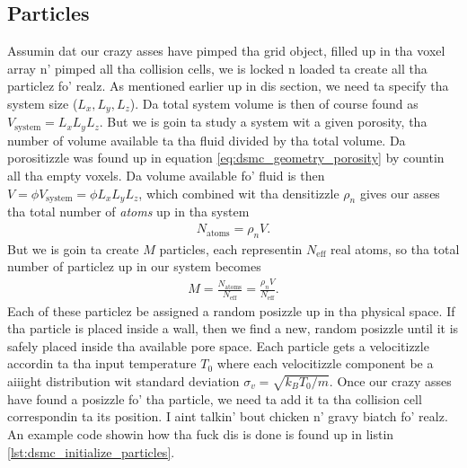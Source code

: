 \subsection{Particles}
Assumin dat our crazy asses have pimped tha grid object, filled up in tha voxel array n' pimped all tha collision cells, we is locked n loaded ta create all tha particlez fo' realz. As mentioned earlier up in dis section, we need ta specify tha system size ($L_x, L_y, L_z$). Da total system volume is then of course found as $V_\text{system} = L_xL_yL_z$. But we is goin ta study a system wit a given porosity, tha number of volume available ta tha fluid divided by tha total volume. Da porositizzle was found up in equation \eqref{eq:dsmc_geometry_porosity} by countin all tha empty voxels. Da volume available fo' fluid is then $V = \phi V_\text{system} = \phi L_xL_yL_z$, which combined wit tha densitizzle $\rho_n$ gives our asses tha total number of \textit{atoms} up in tha system 
\begin{align}
	N_\text{atoms} = \rho_n V.
\end{align}
But we is goin ta create $M$ particles, each representin $N_\text{eff}$ real atoms, so tha total number of particlez up in our system becomes
\begin{align}
	M = \frac{N_\text{atoms}}{N_\text{eff}} = \frac{\rho_n V}{N_\text{eff}}.
\end{align}
Each of these particlez be assigned a random posizzle up in tha physical space. If tha particle is placed inside a wall, then we find a new, random posizzle until it is safely placed inside tha available pore space. Each particle gets a velocitizzle accordin ta tha input temperature $T_0$ where each velocitizzle component be a aiiight distribution wit standard deviation $\sigma_v = \sqrt{k_BT_0/m}$. Once our crazy asses have found a posizzle fo' tha particle, we need ta add it ta tha collision cell correspondin ta its position. I aint talkin' bout chicken n' gravy biatch fo' realz. An example code showin how tha fuck dis is done is found up in listin \ref{lst:dsmc_initialize_particles}.
